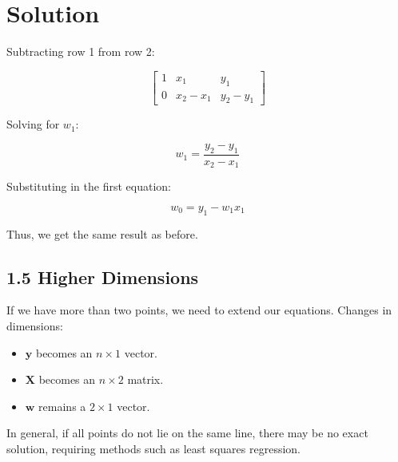 \documentclass{../harvardml}
\theoremstyle{definition}
\theoremstyle{plain}
\newenvironment{solution}
  {\color{blue}\section*{Solution}}
{}
\begin{document}
\begin{solution}
    Subtracting row 1 from row 2:
    
    \[
    \begin{bmatrix}
        1 & x_1 & y_1 \\
        0 & x_2 - x_1 & y_2 - y_1
    \end{bmatrix}
    \]
    
    Solving for $w_1$:
    
    \[
    w_1 = \frac{y_2 - y_1}{x_2 - x_1}
    \]
    
    Substituting in the first equation:
    
    \[
    w_0 = y_1 - w_1 x_1
    \]
    
    Thus, we get the same result as before.
    
    \subsection*{1.5 Higher Dimensions}
    
    If we have more than two points, we need to extend our equations. Changes in dimensions:
    
    \begin{itemize}
        \item $\bm{y}$ becomes an $n \times 1$ vector.
        \item $\bm{X}$ becomes an $n \times 2$ matrix.
        \item $\bm{w}$ remains a $2 \times 1$ vector.
    \end{itemize}
    
    In general, if all points do not lie on the same line, there may be no exact solution, requiring methods such as least squares regression.
    


    
\end{solution}

\color{black}
\newpage
\end{document}
